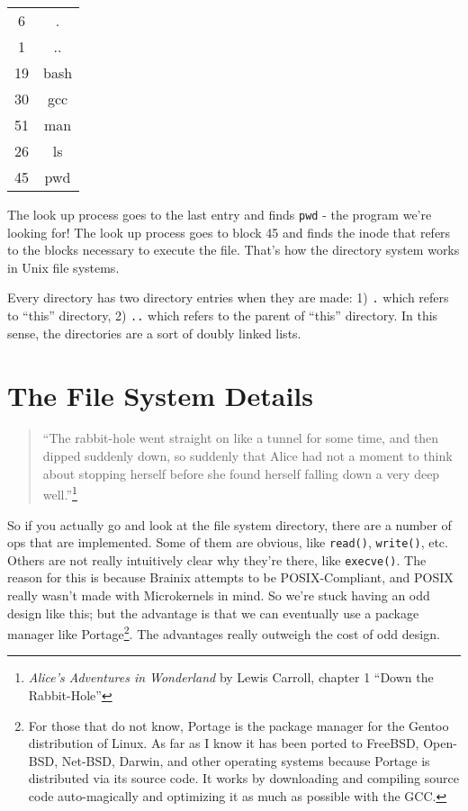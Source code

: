 \begin{tabular}{cc}
 6 & . \\
 1 & .. \\
 19 & \textrm{bash} \\
 30 & \textrm{gcc} \\
 51 & \textrm{man} \\
 26 & \textrm{ls} \\
 45 & \textrm{pwd} 
\end{tabular}

The look up process goes to the last entry and finds \verb|pwd| - the program we're looking for! The look up process goes to block 45 and finds the inode that refers to the blocks necessary to execute the file. That's how the directory system works in Unix file systems.

Every directory has two directory entries when they are made: 1) \verb|.| which refers to ``this'' directory, 2) \verb|..| which refers to the parent of ``this'' directory. In this sense, the directories are a sort of doubly linked lists.

\section{The File System Details}

\begin{quote}
``The rabbit-hole went straight on like a tunnel for some time, and then dipped suddenly down, so suddenly that Alice had not a moment to think about stopping herself before she found herself falling down a very deep well.''\footnote{\textit{Alice's Adventures in Wonderland} by Lewis Carroll, chapter 1 ``Down the Rabbit-Hole''}
\end{quote}

So if you actually go and look at the file system directory, there are a number of ops that are implemented. Some of them are obvious, like \verb|read()|, \verb|write()|, etc. Others are not really intuitively clear why they're there, like \verb|execve()|. The reason for this is because Brainix attempts to be POSIX-Compliant, and POSIX really wasn't made with Microkernels in mind. So we're stuck having an odd design like this; but the advantage is that we can eventually use a package manager like Portage\footnote{For those that do not know, Portage is the package manager for the Gentoo distribution of Linux. As far as I know it has been ported to FreeBSD, Open-BSD, Net-BSD, Darwin, and other operating systems because Portage is distributed via its source code. It works by downloading and compiling source code auto-magically and optimizing it as much as possible with the GCC.}. The advantages really outweigh the cost of odd design.

